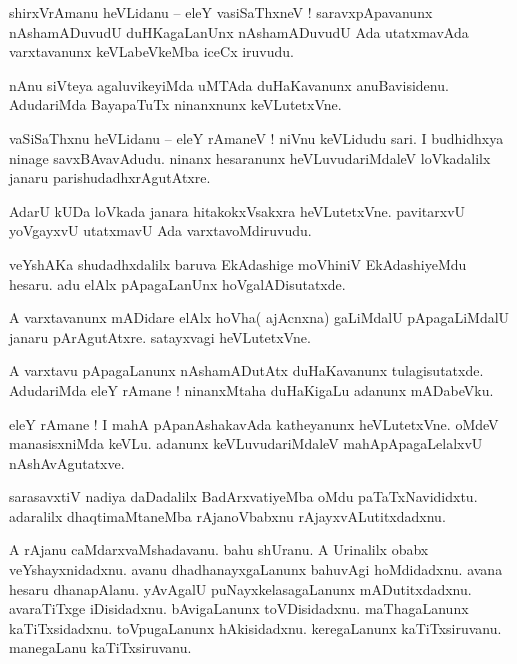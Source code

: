 \documentclass{article}
\begin{document}
\begin{mn}%
shirxVrAmanu heVLidanu -- eleY vasiSaThxneV ! saravxpApavanunx nAshamADuvudU duHKagaLanUnx 
nAshamADuvudU Ada utatxmavAda varxtavanunx keVLabeVkeMba iceCx iruvudu.
\end{mn}

\begin{mn}%
nAnu siVteya agaluvikeyiMda uMTAda duHaKavanunx anuBavisidenu. AdudariMda BayapaTuTx ninanxnunx 
keVLutetxVne.
\end{mn}

\begin{mn}%
vaSiSaThxnu heVLidanu -- eleY rAmaneV ! niVnu keVLidudu sari. I budhidhxya ninage savxBAvavAdudu. 
ninanx hesaranunx heVLuvudariMdaleV loVkadalilx janaru parishudadhxrAgutAtxre.
\end{mn}

\begin{mn}%
AdarU kUDa loVkada janara hitakokxVsakxra heVLutetxVne. pavitarxvU yoVgayxvU utatxmavU Ada 
varxtavoMdiruvudu.
\end{mn}

\begin{mn}%
veYshAKa shudadhxdalilx baruva EkAdashige moVhiniV EkAdashiyeMdu hesaru. adu elAlx pApagaLanUnx 
hoVgalADisutatxde.
\end{mn}

\begin{mn}%
A varxtavanunx mADidare elAlx hoVha( ajAcnxna) gaLiMdalU pApagaLiMdalU janaru pArAgutAtxre. 
satayxvagi heVLutetxVne.
\end{mn}

\begin{mn}%
A varxtavu pApagaLanunx nAshamADutAtx duHaKavanunx tulagisutatxde. AdudariMda eleY rAmane ! 
ninanxMtaha duHaKigaLu adanunx mADabeVku.
\end{mn}

\begin{mn}%
eleY rAmane ! I mahA pApanAshakavAda katheyanunx heVLutetxVne. oMdeV manasisxniMda keVLu. adanunx 
keVLuvudariMdaleV mahApApagaLelalxvU nAshAvAgutatxve.
\end{mn}

\begin{mn}%
sarasavxtiV nadiya daDadalilx BadArxvatiyeMba oMdu paTaTxNavididxtu. adaralilx dhaqtimaMtaneMba 
rAjanoVbabxnu rAjayxvALutitxdadxnu.
\end{mn}

\begin{mn}%
A rAjanu caMdarxvaMshadavanu. bahu shUranu. A Urinalilx obabx veYshayxnidadxnu. avanu 
dhadhanayxgaLanunx bahuvAgi hoMdidadxnu. avana hesaru dhanapAlanu. yAvAgalU puNayxkelasagaLanunx 
mADutitxdadxnu. avaraTiTxge iDisidadxnu. bAvigaLanunx toVDisidadxnu. maThagaLanunx kaTiTxsidadxnu. 
toVpugaLanunx hAkisidadxnu. keregaLanunx kaTiTxsiruvanu. manegaLanu kaTiTxsiruvanu.
\end{mn}
\end{document}
